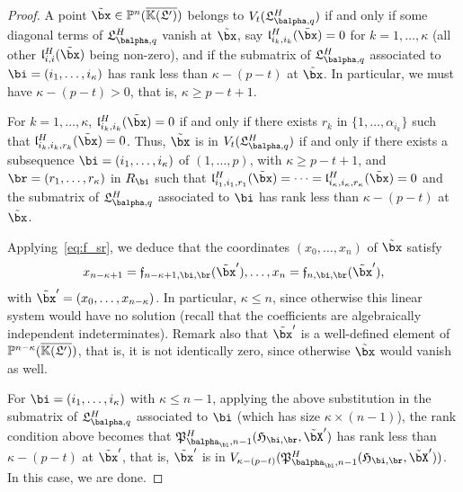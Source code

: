 \documentclass[12pt]{article}
\begin{document}
\begin{proof}
  A point $\tilde\bx \in \P^n(\KKGpbar)$ belongs to
  $V_t(\mathfrak{L}^H_{\balpha,q})$ if and only if some diagonal terms
  of $\mathfrak{L}^H_{\balpha,q}$ vanish at $\tilde\bx$, say
  $\mathfrak{l}^H_{i_k,i_k}(\tilde\bx)=0$ for $k=1,\dots,\kappa$ (all
  other $\mathfrak{l}^H_{i,i}(\tilde\bx)$ being non-zero), and
  if the submatrix of $\mathfrak{L}^H_{\balpha,q}$ associated to
  $\bi=(i_1,\dots,i_\kappa)$ has rank less than $\kappa-(p-t)$ at $\tilde
  \bx$.  In particular, we must have
  $\kappa-(p-t) > 0$, that is, $\kappa \ge p-t+1$.

  For $k=1,\dots,\kappa$, $\mathfrak{l}^H_{i_k,i_k}(\tilde\bx)=0$ if
  and only if there exists $r_k$ in $\{1,\dots,\alpha_{i_k}\}$ such
  that $\mathfrak{l}^H_{i_k,i_k,r_k}(\tilde\bx)=0$. Thus, $\tilde\bx$
  is in $V_t(\mathfrak{L}^H_{\balpha,q})$ if and only if there exists
  a subsequence $\bi=(i_1,\dots,i_\kappa)$  of $(1,\dots,p)$, with
  $\kappa \ge p-t+1$, and $\br=(r_1,\dots,r_\kappa)$ in $R_\bi$ such that
  $\mathfrak{l}^H_{i_1,i_1,r_1}(\tilde\bx)=\cdots=\mathfrak{l}^H_{i_\kappa,i_\kappa,r_\kappa}(\tilde\bx)=0$
  and the submatrix of $\mathfrak{L}^H_{\balpha,q}$ associated to $\bi$
  has rank less than $\kappa-(p-t)$ at $\tilde\bx$.  

  Applying~\eqref{eq:f_sr}, we deduce that the coordinates $(x_0,\dots,x_n)$ 
  of $\tilde \bx$ satisfy
  \begin{align*}
    x_{n-\kappa+1}=\mathfrak{f}_{n-\kappa+1,\bi,\br}(\tilde\bx'),\dots,x_{n}=\mathfrak{f}_{n,\bi,\br}(\tilde\bx'),
  \end{align*}
  with $\tilde\bx'=(x_0,\dots,x_{n-\kappa})$.  In particular, $\kappa
  \le n$, since otherwise this linear system would have no solution
  (recall that the coefficients are algebraically independent
  indeterminates). Remark also that $\tilde\bx'$ is a well-defined
  element of $\mathbb{P}^{n-\kappa}(\overline{\mathbb{K}(\mathfrak{L}')})$, that is, it is not identically
  zero, since otherwise $\tilde\bx$ would vanish as well.

  For $\bi=(i_1,\dots,i_\kappa)$ with $\kappa \le n-1$, applying the above
  substitution in the submatrix of $\mathfrak{L}^H_{\balpha,q}$
  associated to $\bi$ (which has size $\kappa \times (n-1)$), the rank
  condition above becomes that
  $\mathfrak{P}^H_{\balpha_\bi,n-1}(\mathfrak{H}_{\bi,\br},\tilde\bX')$
  has rank less than $\kappa-(p-t)$ at $\tilde \bx'$, that is, $\tilde
  \bx'$ is in
  $V_{\kappa-(p-t)}(\mathfrak{P}^H_{\balpha_\bi,n-1}(\mathfrak{H}_{\bi,\br},\tilde\bX'))$.
  In this case, we are done.


\end{proof}
\end{document}
